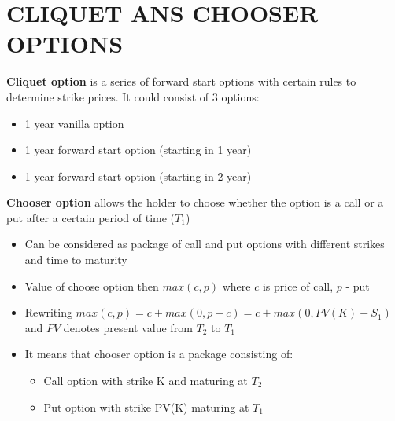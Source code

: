 \documentclass{article}
\begin{document}
\section{CLIQUET ANS CHOOSER OPTIONS}
{\bf Cliquet option} is a series of forward start options with certain rules to determine strike prices. It could consist of 3 options:
\begin{multicols}
    \begin{itemize}
        \item 1 year vanilla option
        \item 1 year forward start option (starting in 1 year)
        \item 1 year forward start option (starting in 2 year)
    \end{itemize}
\end{multicols}
{\bf Chooser option} allows the holder to choose whether the option is a call or a put after a certain period of time ($T_1$)
\begin{multicols}
    \begin{itemize}
        \item Can be considered as package of call and put options with different strikes and time to maturity
        \item Value of choose option then $max(c, p)$ where $c$ is price of call, $p$ - put
        \item Rewriting $max(c, p) = c + max(0, p - c) = c + max(0, PV(K) - S_1)$ and $PV$ denotes present value from $T_2$ to $T_1$
        \item It means that chooser option is a package consisting of:
        \begin{itemize}
         \item Call option with strike K and maturing at $T_2$
         \item Put option with strike PV(K) maturing at $T_1$
       \end{itemize}
    \end{itemize}
\end{multicols}
\end{document}
